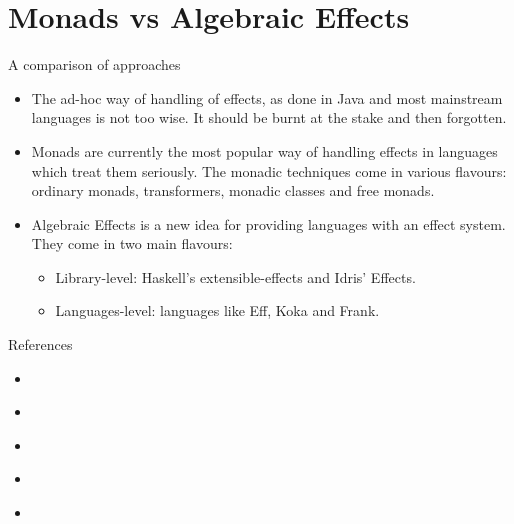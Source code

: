 \documentclass{beamer}
\newcommand{\link}[2]{\href{#2}{\color{blue}{#1}}}
\begin{document}
\section{Monads vs Algebraic Effects}

\begin{frame}{A comparison of approaches}
\begin{itemize}
	\item The ad-hoc way of handling of effects, as done in Java and most mainstream languages is not too wise. It should be burnt at the stake and then forgotten.
	\item Monads are currently the most popular way of handling effects in languages which treat them seriously. The monadic techniques come in various flavours: ordinary monads, transformers, monadic classes and free monads.
	\item Algebraic Effects is a new idea for providing languages with an effect system. They come in two main flavours:
	\begin{itemize}
		\item Library-level: Haskell's extensible-effects and Idris' Effects.
		\item Languages-level: languages like Eff, Koka and Frank.
	\end{itemize}
\end{itemize}
\end{frame}

\begin{frame}{References}
\begin{itemize}
	\item \link{Referential transparency}{https://stackoverflow.com/questions/210835/what-is-referential-transparency}
	\item \link{Free monads}{http://www.haskellforall.com/2012/07/purify-code-using-free-monads.html}
	\item \link{Idris}{http://docs.idris-lang.org/en/latest/index.html}
	\item \link{Koka}{https://koka-lang.github.io/koka/doc/kokaspec.html}
	\item \link{Repo with code of the examples (and of these slides)}{https://github.com/wkolowski/AlgEff}
\end{itemize}
\end{frame}
\end{document}
